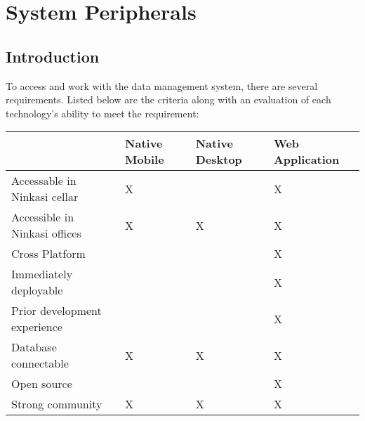\documentclass[draftclsnofoot,onecolumn,letterpaper,10pt,compsoc]{IEEEtran}
\begin{document}
\section{System Peripherals}
    \subsection{Introduction}
    
        To access and work with the data management system, there are several requirements. Listed below are the criteria along with an evaluation of each technology's ability to meet the requirement:\\
        
        
        \begin{center}
            \begin{tabular}{ |m{14em}|m{9em}|m{9em}|m{9em}|}
                \hline
                    & Native Mobile & Native Desktop & Web Application \\
                
                \hline
                    Accessable in Ninkasi cellar & X & & X \\
                    
                \hline
                    Accessible in Ninkasi offices & X & X & X \\
        
                \hline
                    Cross Platform &  &  & X \\
                    
                \hline
                    Immediately deployable &  &  & X \\
                    
                \hline
                    Prior development experience &  &  & X \\
                    
                \hline
                     Database connectable & X & X & X \\
                     
                \hline
                    Open source & & & X \\
                
                \hline
                    Strong community & X & X & X \\
                
                \hline
        
            \end{tabular}
        \end{center}
        
\end{document}
